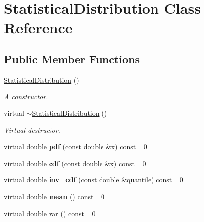 \hypertarget{classStatisticalDistribution}{}\section{Statistical\+Distribution Class Reference}
\label{classStatisticalDistribution}
\subsection*{Public Member Functions}
\begin{DoxyCompactItemize}
\item 
\hyperlink{classStatisticalDistribution_a0c968a41a854b3d33310b7bd78a7238a}{Statistical\+Distribution} ()
\begin{DoxyCompactList}\small\item\em A constructor. \end{DoxyCompactList}\item 
virtual \hyperlink{classStatisticalDistribution_a0e7be123394637fb1bef9e7a23cc5618}{$\sim$\+Statistical\+Distribution} ()
\begin{DoxyCompactList}\small\item\em Virtual destructor. \end{DoxyCompactList}\item 
\mbox{\label{classStatisticalDistribution_aef1b717d8c6bc58c5b5806d1b935eb12}} 
virtual double {\bfseries pdf} (const double \&x) const =0
\item 
\mbox{\label{classStatisticalDistribution_aa7f52f4c8cadc971d9e189453ea0eb95}} 
virtual double {\bfseries cdf} (const double \&x) const =0
\item 
\mbox{\label{classStatisticalDistribution_aff50a79b73032b6f63db797124ec310f}} 
virtual double {\bfseries inv\+\_\+cdf} (const double \&quantile) const =0
\item 
\mbox{\label{classStatisticalDistribution_a68177d55b616f6c2f857ccf7afbf7789}} 
virtual double {\bfseries mean} () const =0
\item 
\mbox{\label{classStatisticalDistribution_ae66c6543b8d40d200b45d26f4fb3e3c2}} 
virtual double \hyperlink{classStatisticalDistribution_ae66c6543b8d40d200b45d26f4fb3e3c2}{var} () const =0

\end{DoxyCompactItemize}
